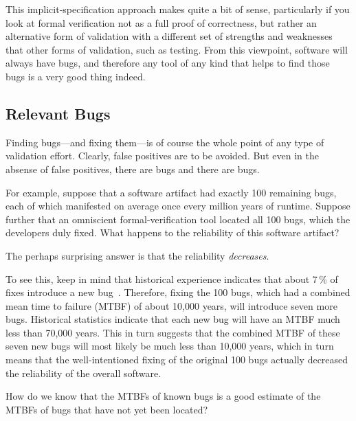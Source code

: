 This implicit-specification approach makes quite a bit of sense, particularly
if you look at formal verification not as a full proof of correctness,
but rather an alternative form of validation with a different set of
strengths and weaknesses that other forms of validation, such as testing.
From this viewpoint, software will always have bugs, and therefore any
tool of any kind that helps to find those bugs is a very good thing
indeed.

\subsection{Relevant Bugs}
\label{sec:formal:Relevant Bugs}

Finding bugs---and fixing them---is of course the whole point of any
type of validation effort.
Clearly, false positives are to be avoided.
But even in the absense of false positives, there are bugs and there are bugs.

For example, suppose that a software artifact had exactly 100 remaining
bugs, each of which manifested on average once every million years
of runtime.
Suppose further that an omniscient formal-verification tool located
all 100 bugs, which the developers duly fixed.
What happens to the reliability of this software artifact?

The perhaps surprising answer is that the reliability \emph{decreases}.

To see this, keep in mind that historical experience indicates that
about 7\,\% of fixes introduce a new bug~\cite{RexBlack2012SQA}.
Therefore, fixing the 100 bugs, which had a combined mean time to failure
(MTBF) of about 10,000 years, will introduce seven more bugs.
Historical statistics indicate that each new bug will have an MTBF
much less than 70,000 years.
This in turn suggests that the combined MTBF of these seven new bugs
will most likely be much less than 10,000 years, which in turn means
that the well-intentioned fixing of the original 100 bugs actually
decreased the reliability of the overall software.

\QuickQuiz{}
	How do we know that the MTBFs of known bugs is a good estimate
	of the MTBFs of bugs that have not yet been located?
 \QuickQuizEnd

